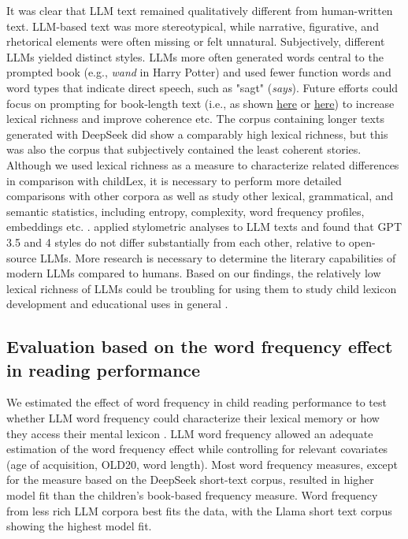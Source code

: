 \documentclass[manuscript]{stjour}
\begin{document}
It was clear that LLM text remained qualitatively different from human-written text. LLM-based text was more stereotypical, while narrative, figurative, and rhetorical elements were often missing or felt unnatural. Subjectively, different LLMs yielded distinct styles. LLMs more often generated words central to the prompted book (e.g., \textit{wand} in Harry Potter) and used fewer function words and word types that indicate direct speech, such as "sagt" (\textit{says}). Future efforts could focus on prompting for book-length text (i.e., as shown \href{https://medium.com/@baen2810/ai-assisted-writing-of-a-book-cataclysm-67788412fb31}{here} or \href{https://eqbench.com/creative_writing_longform.html}{here}) to increase lexical richness and improve coherence etc. The corpus containing longer texts generated with DeepSeek did show a comparably high lexical richness, but this was also the corpus that subjectively contained the least coherent stories. Although we used lexical richness as a measure to characterize related differences in comparison with childLex, it is necessary to perform more detailed comparisons with other corpora as well as study other lexical, grammatical, and semantic statistics, including entropy, complexity, word frequency profiles, embeddings etc. \citep{hu_language_2024, dentella_systematic_2023, munoz-ortiz_contrasting_2024, wu_survey_2024}. \citet{kumarage_neural_2023} applied stylometric analyses to LLM texts and found that GPT 3.5 and 4 styles do not differ substantially from each other, relative to open-source LLMs. More research is necessary to determine the literary capabilities of modern LLMs compared to humans. Based on our findings, the relatively low lexical richness of LLMs could be troubling for using them to study child lexicon development \citep{korochkina_morphology_2025} and educational uses in general \citep[see also ][]{kasneci_chatgpt_2023}.



\subsection*{Evaluation based on the word frequency effect in reading performance}

We estimated the effect of word frequency in child reading performance to test whether LLM word frequency could characterize their lexical memory or how they access their mental lexicon \citep{brysbaert_word_2018, brysbaert_word_2011}. LLM word frequency allowed an adequate estimation of the word frequency effect while controlling for relevant covariates (age of acquisition, OLD20, word length). Most word frequency measures, except for the measure based on the DeepSeek short-text corpus, resulted in higher model fit than the children's book-based frequency measure. Word frequency from less rich LLM corpora best fits the data, with the Llama short text corpus showing the highest model fit. 
\end{document}

